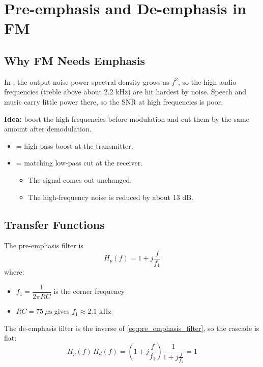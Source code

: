 \section{Pre-emphasis and De-emphasis in FM}

\subsection{Why FM Needs Emphasis}
\label{sec:why_fm_needs_emphasis}

In , the output noise power spectral density grows as $f^2$, so the high audio frequencies (treble above about 2.2 kHz) are hit hardest by noise. Speech and music carry little power there, so the $\mathrm{SNR}$ at high frequencies is poor.

\textbf{Idea:} boost the high frequencies before modulation and cut them by the same amount after demodulation.

\begin{itemize}
    \item {} = high-pass boost at the transmitter.
    \item {} = matching low-pass cut at the receiver.
    \begin{itemize}
        \item The signal comes out unchanged.
        \item The high-frequency noise is reduced by about 13 dB.
    \end{itemize}
\end{itemize}

\subsection{Transfer Functions}
\label{sec:emphasis_transfer_functions}

The pre-emphasis filter is
\begin{equation}
    H_p(f) = 1 + j\frac{f}{f_1}
    \label{eq:pre_emphasis_filter}
\end{equation}
where:
\begin{itemize}
    \item $f_1 = \dfrac{1}{2\pi RC}$ is the corner frequency
    \item $RC = 75\ \mu\text{s}$ gives $f_1 \approx 2.1$ kHz
\end{itemize}

The de-emphasis filter is the inverse of \cref{eq:pre_emphasis_filter}, so the cascade is flat:
\begin{equation}
    H_p(f)\,H_d(f) = \left(1 + j\frac{f}{f_1}\right)\frac{1}{1 + j\frac{f}{f_1}} = 1
    \label{eq:emphasis_cascade}
\end{equation}

